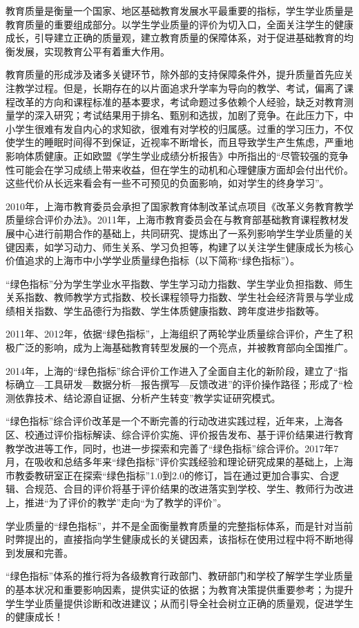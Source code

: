 \vspace{10mm}
\vspace{5mm}

\myprefacetext

教育质量是衡量一个国家、地区基础教育发展水平最重要的指标，学生学业质量是教育质量的重要组成部分。以学生学业质量的评价为切入口，全面关注学生的健康成长，引导建立正确的质量观，建立教育质量的保障体系，对于促进基础教育的均衡发展，实现教育公平有着重大作用。

教育质量的形成涉及诸多关键环节，除外部的支持保障条件外，提升质量首先应关注教学过程。但是，长期存在的以片面追求升学率为导向的教学、考试，偏离了课程改革的方向和课程标准的基本要求，考试命题过多依赖个人经验，缺乏对教育测量学的深入研究；考试结果用于排名、甄别和选拔，加剧了竞争。在此压力下，中小学生很难有发自内心的求知欲，很难有对学校的归属感。过重的学习压力，不仅使学生的睡眠时间得不到保证，近视率不断增长，而且导致学生产生焦虑，严重地影响体质健康。正如欧盟《学生学业成绩分析报告》中所指出的“尽管较强的竞争性可能会在学习成绩上带来收益，但在学生的动机和心理健康方面却会付出代价。这些代价从长远来看会有一些不可预见的负面影响，如对学生的终身学习”。

2010年，上海市教育委员会承担了国家教育体制改革试点项目《改革义务教育教学质量综合评价办法》。2011年，上海市教育委员会在与教育部基础教育课程教材发展中心进行前期合作的基础上，共同研究、提炼出了一系列影响学生学业质量的关键因素，如学习动力、师生关系、学习负担等，构建了以关注学生健康成长为核心价值追求的上海市中小学学业质量绿色指标（以下简称“绿色指标”）。


“绿色指标”分为学生学业水平指数、学生学习动力指数、学生学业负担指数、师生关系指数、教师教学方式指数、校长课程领导力指数、学生社会经济背景与学业成绩相关指数、学生品德行为指数、学生体质健康指数、跨年度进步指数等。


2011年、2012年，依据“绿色指标”，上海组织了两轮学业质量综合评价，产生了积极广泛的影响，成为上海基础教育转型发展的一个亮点，并被教育部向全国推广。


2014年，上海的“绿色指标”综合评价工作进入了全面自主化的新阶段，建立了“指标确立—工具研发—数据分析—报告撰写—反馈改进”的评价操作路径；形成了“检测依靠技术、结论源自证据、分析产生转变”教学实证研究模式。


“绿色指标”综合评价改革是一个不断完善的行动改进实践过程，近年来，上海各区、校通过评价指标解读、综合评价实施、评价报告发布、基于评价结果进行教育教学改进等工作，同时，也进一步探索和完善了“绿色指标”综合评价。2017年7月，在吸收和总结多年来“绿色指标”评价实践经验和理论研究成果的基础上，上海市教委教研室正在探索“绿色指标”1.0到2.0的修订，旨在通过更加合事实、合逻辑、合规范、合目的评价将基于评价结果的改进落实到学校、学生、教师行为改进上，推进“为了评价的教学”走向“为了教学的评价”。


学业质量的“绿色指标”，并不是全面衡量教育质量的完整指标体系，而是针对当前时弊提出的，直接指向学生健康成长的关键因素，该指标在使用过程中将不断地得到发展和完善。


“绿色指标”体系的推行将为各级教育行政部门、教研部门和学校了解学生学业质量的基本状况和重要影响因素，提供实证的依据；为教育决策提供重要参考；为提升学生学业质量提供诊断和改进建议；从而引导全社会树立正确的质量观，促进学生的健康成长！

\clearpage
